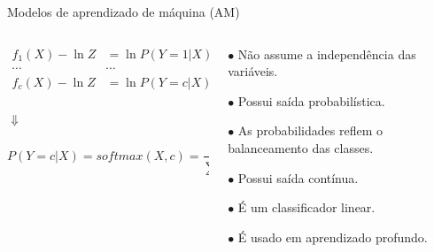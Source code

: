 \begin{frame}{Modelos de aprendizado de máquina (AM)}

\begin{columns}
	\begin{column}{0.55\textwidth}
		\begin{tcolorbox}[colback=blue!5!white,colframe=blue!75!black,valign=center,title=Regressão logística softmax]\selectFont
			\centering
			\begin{equation} 
			\begin{matrix}
			f_1(X) - \ln Z  & = \ln P(Y=1|X) \\
			\cdots & \cdots \\
			f_c(X) - \ln Z & = \ln P(Y=c|X) \\
			\end{matrix}
			\label{eq:logisticaArray}
			\end{equation}
			
			$\Downarrow$
			
			\begin{equation}
			P(Y=c|X) =softmax(X,c) = \frac{e^{f_c(X)}}{\sum_{k=1}^{K} e^{f_k(X)}}
			\label{eq:softmax}
			\end{equation}
		\end{tcolorbox}
	\end{column}
	\begin{column}{0.45\textwidth}
		\begin{tcolorbox}[colback=blue!5!white,colframe=blue!75!black,valign=center,title=Propriedades]\selectFont
			$\bullet$ Não assume a independência das variáveis.
			
			$\bullet$ Possui saída probabilística.
			
			$\bullet$ As probabilidades reflem o balanceamento das classes.
			
			$\bullet$ Possui saída contínua.
			
			$\bullet$ É um classificador linear.
			
			$\bullet$ É usado em aprendizado profundo.
		\end{tcolorbox}
	\end{column}
\end{columns}

\end{frame}